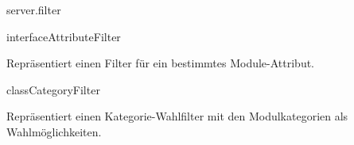 


\begin{texdocpackage}{server.filter}
\label{texdoclet:edu.kit.informatik.studyplan.server.filter}

\begin{texdocclass}{interface}{AttributeFilter}
\label{texdoclet:edu.kit.informatik.studyplan.server.filter.AttributeFilter}
\begin{texdocclassintro}
Repräsentiert einen Filter für ein bestimmtes Module-Attribut.\end{texdocclassintro}
\begin{texdocclassmethods}
\end{texdocclassmethods}
\end{texdocclass}


\begin{texdocclass}{class}{CategoryFilter}
\label{texdoclet:edu.kit.informatik.studyplan.server.filter.CategoryFilter}
\begin{texdocclassintro}
Repräsentiert einen Kategorie-Wahlfilter mit den Modulkategorien als Wahlmöglichkeiten.\end{texdocclassintro}
\begin{texdocclassconstructors}
\end{texdocclassconstructors}
\begin{texdocclassmethods}
\end{texdocclassmethods}
\end{texdocclass}



\end{texdocpackage}
